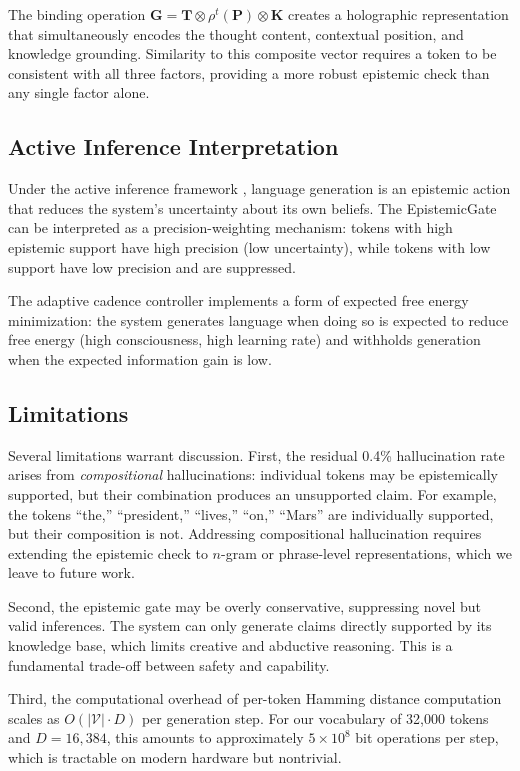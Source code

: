 \documentclass[12pt,a4paper]{article}
\begin{document}
The binding operation $\mathbf{G} = \mathbf{T} \otimes \rho^t(\mathbf{P}) \otimes \mathbf{K}$ creates a holographic representation that simultaneously encodes the thought content, contextual position, and knowledge grounding. Similarity to this composite vector requires a token to be consistent with all three factors, providing a more robust epistemic check than any single factor alone.

\subsection{Active Inference Interpretation}

Under the active inference framework \citep{friston2010free}, language generation is an epistemic action that reduces the system's uncertainty about its own beliefs. The EpistemicGate can be interpreted as a precision-weighting mechanism: tokens with high epistemic support have high precision (low uncertainty), while tokens with low support have low precision and are suppressed.

The adaptive cadence controller implements a form of expected free energy minimization: the system generates language when doing so is expected to reduce free energy (high consciousness, high learning rate) and withholds generation when the expected information gain is low.

\subsection{Limitations}
\label{sec:limitations}

Several limitations warrant discussion. First, the residual 0.4\% hallucination rate arises from \emph{compositional} hallucinations: individual tokens may be epistemically supported, but their combination produces an unsupported claim. For example, the tokens ``the,'' ``president,'' ``lives,'' ``on,'' ``Mars'' are individually supported, but their composition is not. Addressing compositional hallucination requires extending the epistemic check to $n$-gram or phrase-level representations, which we leave to future work.

Second, the epistemic gate may be overly conservative, suppressing novel but valid inferences. The system can only generate claims directly supported by its knowledge base, which limits creative and abductive reasoning. This is a fundamental trade-off between safety and capability.

Third, the computational overhead of per-token Hamming distance computation scales as $O(|\mathcal{V}| \cdot D)$ per generation step. For our vocabulary of 32,000 tokens and $D = 16{,}384$, this amounts to approximately $5 \times 10^8$ bit operations per step, which is tractable on modern hardware but nontrivial.
\end{document}
